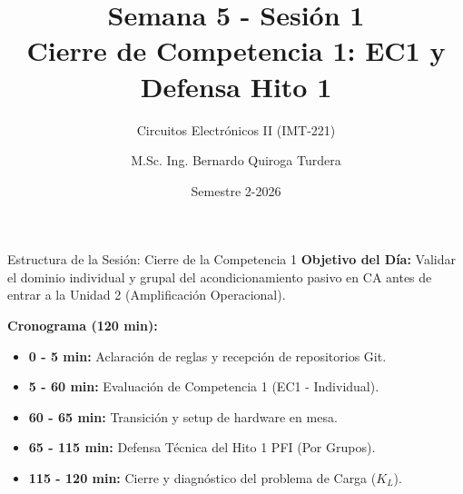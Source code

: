 \documentclass[aspectratio=169, 10pt]{beamer}
\title[Evaluación EC1 e Hito 1]{Semana 5 - Sesión 1\\Cierre de Competencia 1: EC1 y Defensa Hito 1}
\subtitle{Circuitos Electrónicos II (IMT-221)}
\author[M.Sc. Ing. B. Quiroga]{M.Sc. Ing. Bernardo Quiroga Turdera}
\institute[UCB Tarija]{Universidad Católica Boliviana ``San Pablo''}
\date{Semestre 2-2026}
\begin{document}
\begin{frame}
    \titlepage
\end{frame}

\begin{frame}{Estructura de la Sesión: Cierre de la Competencia 1}
    \textbf{Objetivo del Día:} Validar el dominio individual y grupal del acondicionamiento pasivo en CA antes de entrar a la Unidad 2 (Amplificación Operacional).
    
    \vspace{0.3cm}
    \textbf{Cronograma (120 min):}
    \begin{itemize}
        \setlength{\itemsep}{6pt}
        \item \textbf{0 - 5 min:} Aclaración de reglas y recepción de repositorios Git.
        \item \textbf{5 - 60 min:} Evaluación de Competencia 1 (EC1 - Individual).
        \item \textbf{60 - 65 min:} Transición y setup de hardware en mesa.
        \item \textbf{65 - 115 min:} Defensa Técnica del Hito 1 PFI (Por Grupos).
        \item \textbf{115 - 120 min:} Cierre y diagnóstico del problema de Carga ($K_L$).
    \end{itemize}
\end{frame}
\end{document}
